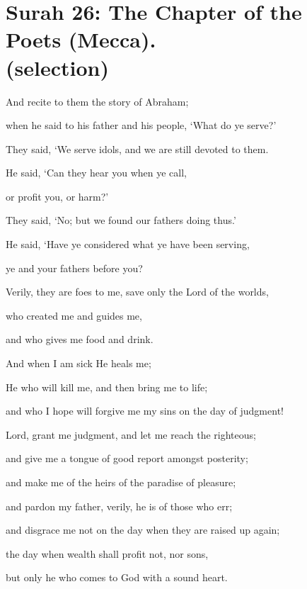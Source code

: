 \documentclass[fontsize=14pt, letterpaper, notitlepage, openany, DIV=12]{scrbook} %
\begin{document}
\section[Surah 26: The Chapter of the Poets (Mecca).]{Surah 26: The Chapter of the Poets (Mecca).\\ (selection)}


\noindent[26:69]
And recite to them the story of Abraham;

\noindent[26:70]
when he said to his father and his people, `What do ye serve?'

\noindent[26:71]
They said, `We serve idols, and we are still devoted to them.

\noindent[26:72]
He said, `Can they hear you when ye call,

\noindent[26:73]
or profit you, or harm?'

\noindent[26:74]
They said, `No; but we found our fathers doing thus.'

\noindent[26:75]
He said, `Have ye considered what ye have been serving,

\noindent[26:76]
ye and your fathers before you?

\noindent[26:77]
Verily, they are foes to me, save only the Lord of the worlds,

\noindent[26:78]
who created me and guides me,

\noindent[26:79]
and who gives me food and drink.

\noindent[26:80]
And when I am sick He heals me;

\noindent[26:81]
He who will kill me, and then bring me to life;

\noindent[26:82]
and who I hope will forgive me my sins on the day of judgment!

\noindent[26:83]
Lord, grant me judgment, and let me reach the righteous;

\noindent[26:84]
and give me a tongue of good report amongst posterity;

\noindent[26:85]
and make me of the heirs of the paradise of pleasure;

\noindent[26:86]
and pardon my father, verily, he is of those who err;

\noindent[26:87]
and disgrace me not on the day when they are raised up again;

\noindent[26:88]
the day when wealth shall profit not, nor sons,

\noindent[26:89]
but only he who comes to God with a sound heart.
\end{document}
